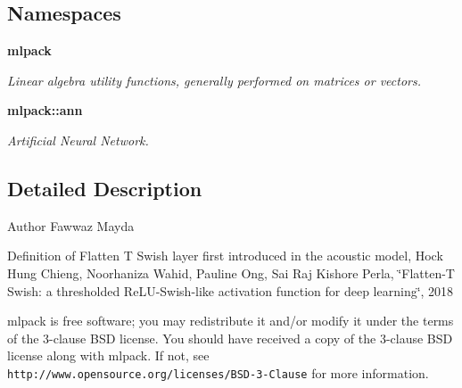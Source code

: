 \subsection*{Namespaces}
\begin{DoxyCompactItemize}
\item 
 \textbf{ mlpack}
\begin{DoxyCompactList}\small\item\em Linear algebra utility functions, generally performed on matrices or vectors. \end{DoxyCompactList}\item 
 \textbf{ mlpack\+::ann}
\begin{DoxyCompactList}\small\item\em Artificial Neural Network. \end{DoxyCompactList}\end{DoxyCompactItemize}


\subsection{Detailed Description}
\begin{DoxyAuthor}{Author}
Fawwaz Mayda
\end{DoxyAuthor}
Definition of Flatten T Swish layer first introduced in the acoustic model, Hock Hung Chieng, Noorhaniza Wahid, Pauline Ong, Sai Raj Kishore Perla, \char`\"{}\+Flatten-\/\+T Swish\+: a thresholded Re\+L\+U-\/\+Swish-\/like activation function for deep learning\char`\"{}, 2018

mlpack is free software; you may redistribute it and/or modify it under the terms of the 3-\/clause B\+SD license. You should have received a copy of the 3-\/clause B\+SD license along with mlpack. If not, see {\tt http\+://www.\+opensource.\+org/licenses/\+B\+S\+D-\/3-\/\+Clause} for more information. 